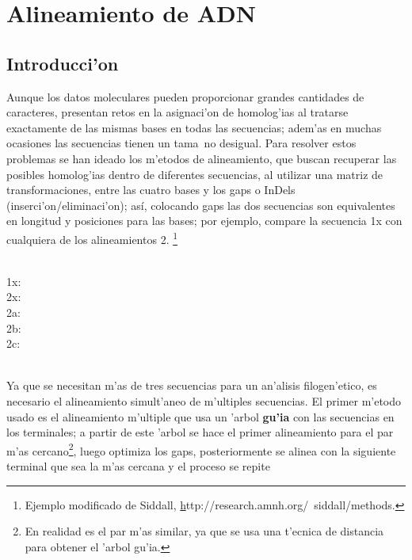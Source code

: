 \chapter{Alineamiento de ADN}
\section*{Introducci'on}
\label{ch:alinear}
Aunque los datos moleculares pueden proporcionar grandes cantidades de caracteres, presentan retos 
en la asignaci'on de homolog'ias al tratarse exactamente de las mismas bases en todas las secuencias; adem'as 
en muchas ocasiones las secuencias tienen un tama~no desigual. 
Para resolver estos problemas se han ideado los m'etodos de alineamiento, que buscan recuperar las posibles homolog'ias 
dentro de diferentes secuencias, al utilizar una matriz de transformaciones, entre las cuatro bases y los gaps o 
InDels (inserci'on/eliminaci'on); as\'i, colocando gaps las dos secuencias son equivalentes en longitud y  posiciones
 para las bases; por ejemplo, compare la secuencia 1x con cualquiera de los alineamientos 2.
 \footnote{Ejemplo modificado de Siddall, \href{}http://research.amnh.org/~siddall/methods.}\\
\\
\begin{small}
1x: \\
2x: \\
2a: \\
2b: \\
2c: \\
\end{small}
\\
Ya que se necesitan m'as de tres secuencias para un an'alisis filogen'etico, es necesario el alineamiento simult'aneo de 
m'ultiples secuencias. El primer m'etodo usado es el alineamiento m'ultiple que usa un 'arbol \textbf{gu'ia} con las 
secuencias en los terminales; a partir de este 'arbol se hace el primer alineamiento para el par m'as 
cercano\footnote{En realidad es el par m'as similar, ya que se usa una t'ecnica de distancia para obtener el 'arbol gu'ia.}, 
luego optimiza los gaps, posteriormente se alinea con la siguiente terminal que sea la m'as cercana y el proceso se repite 
